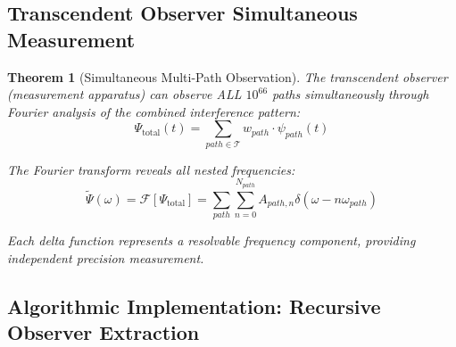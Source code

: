 \documentclass[12pt,a4paper]{article}
\newtheorem{theorem}{Theorem}[section]
\begin{document}
\subsection{Transcendent Observer Simultaneous Measurement}

\begin{theorem}[Simultaneous Multi-Path Observation]
The transcendent observer (measurement apparatus) can observe ALL $10^{66}$ paths simultaneously through Fourier analysis of the combined interference pattern:
\begin{equation}
\Psi_{\text{total}}(t) = \sum_{path \in \mathcal{T}} w_{path} \cdot \psi_{path}(t)
\end{equation}

The Fourier transform reveals all nested frequencies:
\begin{equation}
\tilde{\Psi}(\omega) = \mathcal{F}[\Psi_{\text{total}}] = \sum_{path} \sum_{n=0}^{N_{path}} A_{path,n} \delta(\omega - n\omega_{path})
\end{equation}

Each delta function represents a resolvable frequency component, providing independent precision measurement.
\end{theorem}

\subsection{Algorithmic Implementation: Recursive Observer Extraction}
\end{document}
